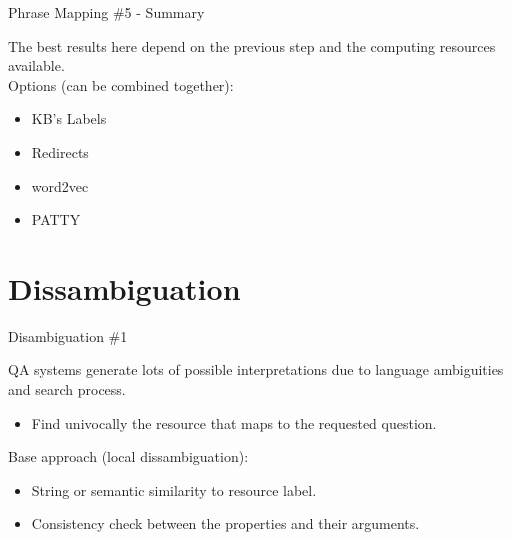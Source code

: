 \documentclass{beamer}
\begin{document}
\begin{frame}{Phrase Mapping \#5 - Summary}
  \begin{card}
    The best results here depend on the previous step and the computing resources available. \\
    Options (can be combined together):
    \begin{itemize}
      \item KB's Labels
      \item Redirects
      \item word2vec
      \item PATTY
    \end{itemize}
  \end{card}
\end{frame}


\section{Dissambiguation}

\begin{frame}{Disambiguation \#1}
  \begin{card}
    QA systems generate lots of possible interpretations due to language ambiguities and search process.
    \begin{itemize}
      \item Find univocally the resource that maps to the requested question.
    \end{itemize}
  \end{card}
  \begin{card}
    Base approach (local dissambiguation):
    \begin{itemize}
      \item String or semantic similarity to resource label.
      \item Consistency check between the properties and their arguments.
    \end{itemize}
  \end{card}
\end{frame}
\end{document}
